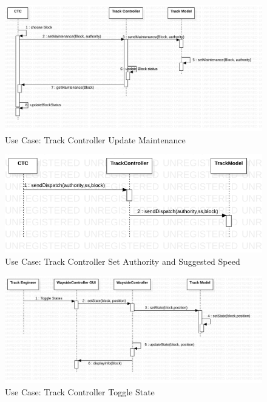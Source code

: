 \documentclass{article}
\begin{document}
    \begin{figure}[H]
        \centering
        \includegraphics[width=\textwidth]{./SequenceDiagrams/TrackController_UpdateMaintenance.png}
        \caption{Use Case: Track Controller Update Maintenance}
        \label{fig: Use Case: Track Controller Update Maintenance Mode}
    \end{figure}
    \begin{figure}[H]
        \centering
        \includegraphics[width=\textwidth]{./SequenceDiagrams/TrackController_Dispatch.png}
        \caption{Use Case: Track Controller Set Authority and Suggested Speed}
        \label{fig:Track Controller Get Suggested Speed and Authority}
    \end{figure}
    \begin{figure}[H]
        \centering
        \includegraphics[width=\textwidth]{./SequenceDiagrams/TrackController_ToggleState.png}
        \caption{Use Case: Track Controller Toggle State}
        \label{fig: Use Case: Track Controller Toggle States}
    \end{figure}
\end{document}
